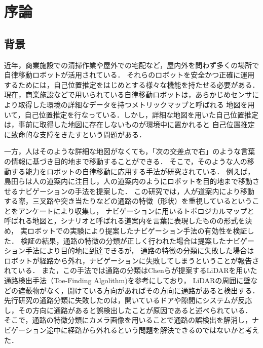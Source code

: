 \documentclass[../main]{subfiles}
\begin{document}
    \setcounter{secnumdepth}{2}
    \chapter{序論}
        \section{背景}
        近年，商業施設での清掃作業や屋外での宅配など，屋内外を問わず多くの場所で自律移動ロボットが活用されている．
        それらのロボットを安全かつ正確に運用するためには，自己位置推定をはじめとする様々な機能を持たせる必要がある．
        現在，商業施設などで用いられている自律移動ロボットは，あらかじめセンサにより取得した環境の詳細なデータを持つメトリックマップと呼ばれる
        地図を用いて，自己位置推定を行なっている．しかし，詳細な地図を用いた自己位置推定は，事前に取得した地図に存在しないものが環境中に置かれると
        自己位置推定に致命的な支障をきたすという問題がある．
        
        
        一方，人はそのような詳細な地図がなくても，「次の交差点で右」のような言葉の情報に基づき目的地まで移動することができる．
        そこで，そのような人の移動する能力をロボットの自律移動に応用する手法が研究されている．
        例えば，島田らは人の道案内に注目し，人の道案内のようにロボットを目的地まで移動させるナビゲーションの手法を提案した\cite{shimada_paper1}\cite{shimada_paper2}．
        この研究では，人が道案内により移動する際，三叉路や突き当たりなどの通路の特徴（形状）を重視しているということをアンケートにより収集し，
        ナビゲーションに用いるトポロジカルマップと呼ばれる地図と，シナリオと呼ばれる道案内を言葉に表現したものの形式を決め，
        実ロボットでの実験により提案したナビゲーション手法の有効性を検証した．
        検証の結果，通路の特徴の分類が正しく行われた場合は提案したナビゲーション手法により目的地に到達できるが，
        通路の特徴の分類に失敗した場合はロボットが経路から外れ，ナビゲーションに失敗してしまうということが報告されている．
        また，この手法では通路の分類はChenらが提案するLiDARを用いた通路検出手法（Toe-Finding Algolithm)\cite{toe-finding_paper}を参考にしており，
        LiDARの周囲に壁などの遮蔽物がなく，開けている方向があればその方向に通路があると検出する．
        先行研究の通路分類に失敗したのは，開いているドアや隙間にシステムが反応し，その方向に通路があると誤検出したことが原因であると述べられている．
        そこで，通路の特徴分類にカメラ画像を用いることで通路の誤検出を解消し，ナビゲーション途中に経路から外れるという問題を解決できるのではないかと考えた．

        \newpage
\end{document}
